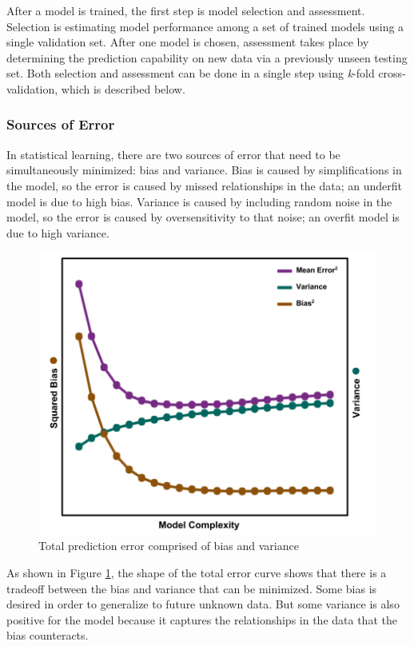 After a model is trained, the first step is model selection and assessment.
Selection is estimating model performance among a set of trained models using a
single validation set.  After one model is chosen, assessment takes place by
determining the prediction capability on new data via a previously unseen
testing set. Both selection and assessment can be done in a single step using
\textit{k}-fold cross-validation, which is described below.

\subsubsection{Sources of Error} 

In statistical learning, there are two sources of error that need to be
simultaneously minimized: bias and variance. Bias is caused by simplifications
in the model, so the error is caused by missed relationships in the data; an
underfit model is due to high bias.  Variance is caused by including random
noise in the model, so the error is caused by oversensitivity to that noise; an
overfit model is due to high variance. 
\\
\begin{figure}[!htb]
  \includegraphics[width=\linewidth]{./chapters/litrev/BVtradeoff.png}
  \caption{Total prediction error comprised of bias and variance}
  \label{fig:bvtradeoff}
\end{figure}

As shown in Figure \ref{fig:bvtradeoff}, the shape of the total error curve
shows that there is a tradeoff between the bias and variance that can be
minimized. Some bias is desired in order to generalize to future unknown data.
But some variance is also positive for the model because it captures the
relationships in the data that the bias counteracts. 

